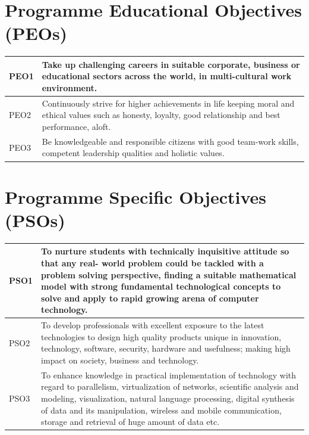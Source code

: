 \documentclass[12pt,a4paper]{report}
\begin{document}
\section*{\hfil\normalsize{\textbf{Programme Educational Objectives (PEOs) }}\hfil}
\doublespacing

\begin{longtable}{| p{} | p{} |}
\hline
PEO1 & Take up challenging careers in suitable corporate, business or educational
sectors across the world, in multi-cultural work environment.
\\
\hline
PEO2 & Continuously strive for higher achievements in life keeping moral and ethical
values such as honesty, loyalty, good relationship and best performance, aloft.
 \\
\hline
PEO3 & Be knowledgeable and responsible citizens with good team-work skills,
competent leadership qualities and holistic values.
 \\
\hline


\end{longtable}

\vspace{1cm}

\section*{\hfil\normalsize{\textbf{Programme Specific Objectives (PSOs)}}\hfil}
\doublespacing

\begin{longtable}{| p{} | p{} |}
\hline
PSO1 & To nurture students with technically inquisitive attitude so that any real- world
problem could be tackled with a problem solving perspective, finding a suitable
mathematical model with strong fundamental technological concepts to solve
and apply to rapid growing arena of computer technology.
\\
\hline
PSO2 & To develop professionals with excellent exposure to the latest technologies to
design high quality products unique in innovation, technology, software,
security, hardware and usefulness; making high impact on society, business and technology.
 \\
\hline
PSO3 & To enhance knowledge in practical implementation of technology with regard
to  parallelism,  virtualization of networks,  scientific  analysis  and  modeling,
visualization,  natural language processing,  digital synthesis  of  data and  its
manipulation,  wireless and  mobile communication,  storage and retrieval  of
huge amount of data etc.
 \\
\hline


\end{longtable}
\end{document}

